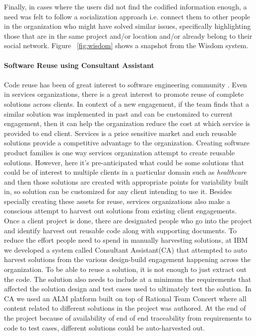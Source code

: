 Finally, in cases where the users did not find the codified information enough, a need was felt to follow a socialization approach i.e. connect them to other people in the organization who might have solved similar issues, specifically highlighting those that are in the same project and/or location and/or already belong to their social network. Figure ~\ref{fig:wisdom} shows a snapshot from the Wisdom system.\\
\\
{\bf Software Reuse using Consultant Assistant}\\
\\
Code reuse has been of great interest to software engineering community \cite{}. Even in services organizations, there is a great interest to promote reuse of complete solutions across clients. In context of a new engagement, if the team finds that a similar solution was implemented in past and can be customized to current engagement, then it can help the organization reduce the cost at which service is provided to end client. Services is a price sensitive market and such reusable solutions provide a competitive advantage to the organization. Creating software product families \cite{} is one way services organization attempt to create reusable solutions. However, here it's pre-anticipated what could be some solutions that could be of interest to multiple clients in a particular domain such as \textit{healthcare} and then those solutions are created with appropriate points for variability built in, so solution can be customized for any client intending to use it. Besides specially creating these assets for reuse, services organizations also make a conscious attempt to harvest out solutions from existing client engagements. Once a client project is done, there are designated people who go into the project and identify harvest out reusable code along with supporting documents. To reduce the effort people need to spend in manually harvesting solutions, at IBM we developed a system called Consultant Assistant\cite{}(CA) that attempted to auto harvest solutions from the various design-build engagement happening across the organization. To be able to reuse a solution, it is not enough to just extract out the code. The solution also needs to include at a minimum the requirements that affected the solution design and test cases used to ultimately test the solution. In CA we used an ALM platform built on top of Rational Team Concert where all content related to different solutions in the project was authored. At the end of the project because of availability of end of end traceability from requirements to code to test cases, different solutions could be auto-harvested out. 

